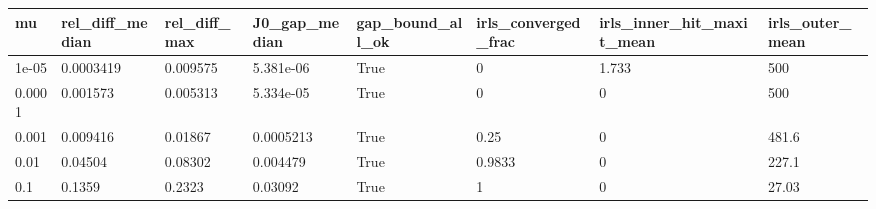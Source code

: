 \begin{tabular}{llllllll}
\hline
mu & rel\_diff\_median & rel\_diff\_max & J0\_gap\_median & gap\_bound\_all\_ok & irls\_converged\_frac & irls\_inner\_hit\_maxit\_mean & irls\_outer\_mean \\
\hline
1e-05 & 0.0003419 & 0.009575 & 5.381e-06 & True & 0 & 1.733 & 500 \\
0.0001 & 0.001573 & 0.005313 & 5.334e-05 & True & 0 & 0 & 500 \\
0.001 & 0.009416 & 0.01867 & 0.0005213 & True & 0.25 & 0 & 481.6 \\
0.01 & 0.04504 & 0.08302 & 0.004479 & True & 0.9833 & 0 & 227.1 \\
0.1 & 0.1359 & 0.2323 & 0.03092 & True & 1 & 0 & 27.03 \\
\hline
\end{tabular}
